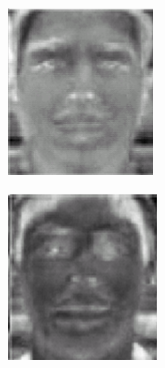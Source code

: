 \begin{figure}[ht]
  \centering
  \begin{subfigure}[b]{0.18\textwidth}
    \centering
    \includegraphics[width=\textwidth]{images/q3_eigenface_ex1.png}
  \end{subfigure}
  \hspace{2em}
  \begin{subfigure}[b]{0.18\textwidth}
    \centering
    \includegraphics[width=\textwidth]{images/q3_eigenface_ex2.png}

\end{subfigure}
\end{figure}
